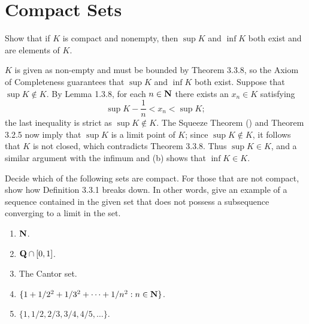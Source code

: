 \documentclass{lew98_solutions}
\begin{document}
\section{Compact Sets}
\label{sec:3.3}

\begin{exercise}
\label{ex:3.3.1}
    Show that if \( K \) is compact and nonempty, then \( \sup K \) and \( \inf K \) both exist and are elements of \( K \).
\end{exercise}

\begin{solution}
    \( K \) is given as non-empty and must be bounded by Theorem 3.3.8, so the Axiom of Completeness guarantees that \( \sup K \) and \( \inf K \) both exist. Suppose that \( \sup K \not\in K \). By Lemma 1.3.8, for each \( n \in \mathbf{N} \) there exists an \( x_n \in K \) satisfying
    \[
        \sup K - \frac{1}{n} < x_n < \sup K;
    \]
    the last inequality is strict as \( \sup K \not\in K \). The Squeeze Theorem () and Theorem 3.2.5 now imply that \( \sup K \) is a limit point of \( K \); since \( \sup K \not\in K \), it follows that \( K \) is not closed, which contradicts Theorem 3.3.8. Thus \( \sup K \in K \), and a similar argument with the infimum and  (b) shows that \( \inf K \in K \).
\end{solution}

\begin{exercise}
\label{ex:3.3.2}
    Decide which of the following sets are compact. For those that are not compact, show how Definition 3.3.1 breaks down. In other words, give an example of a sequence contained in the given set that does not possess a subsequence converging to a limit in the set.
    \begin{enumerate}
        \item \( \mathbf{N} \).

        \item \( \mathbf{Q} \cap [0, 1] \).

        \item The Cantor set.

        \item \( \{ 1 + 1/2^2 + 1/3^2 + \cdots + 1/n^2 : n \in \mathbf{N} \} \).

        \item \( \{ 1, 1/2, 2/3, 3/4, 4/5, \ldots \} \).
    \end{enumerate}
\end{exercise}
\end{document}

